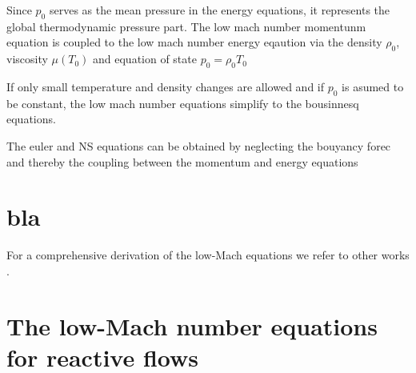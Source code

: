	Since $p_0$ serves as the mean pressure in the energy equations, it represents the global thermodynamic pressure part. %
	The low mach number momentunm equation is coupled to the low mach number energy eqaution via the density $\rho_0$, viscosity $\mu(T_0)$ and equation of state $p_0 = \rho_0T_0$
	
	If only small temperature and density changes are allowed and if $p_0$ is asumed to be constant, the low mach number equations simplify to the bousinnesq equations. 
	
	The euler and NS equations can be obtained by neglecting the bouyancy forec and thereby the coupling between the momentum and energy equations












\section{bla}\label{AP:DerivationOfLowMach}


 For a comprehensive derivation of the low-Mach equations we refer to other works\cite{majdaDerivationNumericalSolution1985} \cite{rauwoensConservativeDiscreteCompatibilityconstraint2009} \cite{mullerLowMachNumberAsymptoticsNavierStokes1998} \cite{kleinNumericalModellingHigh2002}.  
\section{The low-Mach number equations for reactive flows}


